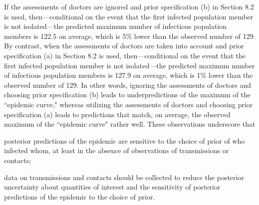If the assessments of doctors are ignored and prior specification (b) in Section 8.2 is used,
then---conditional on the event that the first infected population member is not isolated---the predicted maximum number of infectious population members is 122.5 on average, 
which is 5\% lower than the observed number of 129.
By contrast,
when the assessments of doctors are taken into account and prior specification (a) in Section 8.2 is used,
then---conditional on the event that the first infected population member is not isolated---the predicted maximum number of infectious population members is 127.9 on average,
which is 1\% lower than the observed number of 129.
In other words,
ignoring the assessments of doctors and choosing prior specification (b) leads to underpredictions of the maximum of the ``epidemic curve,"
whereas utilizing the assessments of doctors and choosing prior specification (a) leads to predictions that match,
on average,
the observed maximum of the ``epidemic curve" rather well.
These observations underscore that
\bi
\item posterior predictions of the epidemic are sensitive to the choice of prior of who infected whom,
at least in the absence of observations of transmissions or contacts;
\item data on transmissions and contacts should be collected to reduce the posterior uncertainty about quantities of interest and the sensitivity of posterior predictions of the epidemic to the choice of prior.
\ei
